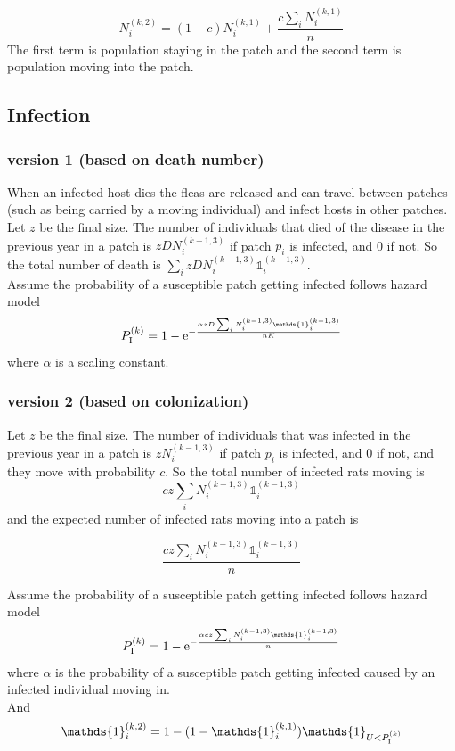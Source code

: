 \documentclass[12pt]{article}
\begin{document}
$$N_i^{(k,2)}=(1-c)N_i^{(k,1)}+\frac{c\sum _iN_i^{(k,1)}}{n}$$
The first term is population staying in the patch and the second term is population moving into the patch. 

\subsection{Infection}
\subsubsection{version 1 (based on death number)}
When an infected host dies the fleas are released and can travel between patches (such as being carried by a moving individual) and infect hosts in other patches. \\

Let $z$ be the final size. The number of individuals that died of the disease in the previous year in a patch is $zDN_i^{(k-1,3)}$ if patch $p_i$ is infected, and  0 if not. So the total number of death is $\sum_i zDN_i^{(k-1,3)}\mathds{1}_i^{(k-1,3)}$. \\

Assume the probability of a susceptible patch getting infected follows hazard model  
$$P_{\rm{I}}^{(k)}=1-{\mathrm{e}}^{-\frac{\alpha zD\sum_iN_i^{(k-1,3)}\mathds{1}_i^{(k-1,3)}}{nK}}$$
where $\alpha$ is a scaling constant.

\subsubsection{version 2 (based on colonization)}
Let $z$ be the final size. The number of individuals that was infected in the previous year in a patch is $zN_i^{(k-1,3)}$ if patch $p_i$ is infected, and  0 if not, and they move with probability $c$. So the total number of infected rats moving is 
$$cz\sum_i N_i^{(k-1,3)}\mathds{1}_i^{(k-1,3)}$$
and the expected number of infected rats moving into a patch is 

$$\frac{cz\sum_i N_i^{(k-1,3)}\mathds{1}_i^{(k-1,3)}}{n}$$

Assume the probability of a susceptible patch getting infected follows hazard model  
$$P_{\rm{I}}^{(k)}=1-{\mathrm{e}}^{-\frac{\alpha cz\sum_i N_i^{(k-1,3)}\mathds{1}_i^{(k-1,3)}}{n}}$$
where $\alpha$ is the probability of a susceptible patch getting infected caused by an infected individual moving in.\\

And
$$\mathds{1}_i^{(k,2)}=1-(1-\mathds{1}_i^{(k,1)})\mathds{1}_{U<P_{\rm{I}}^{(k)}}$$
\end{document}
